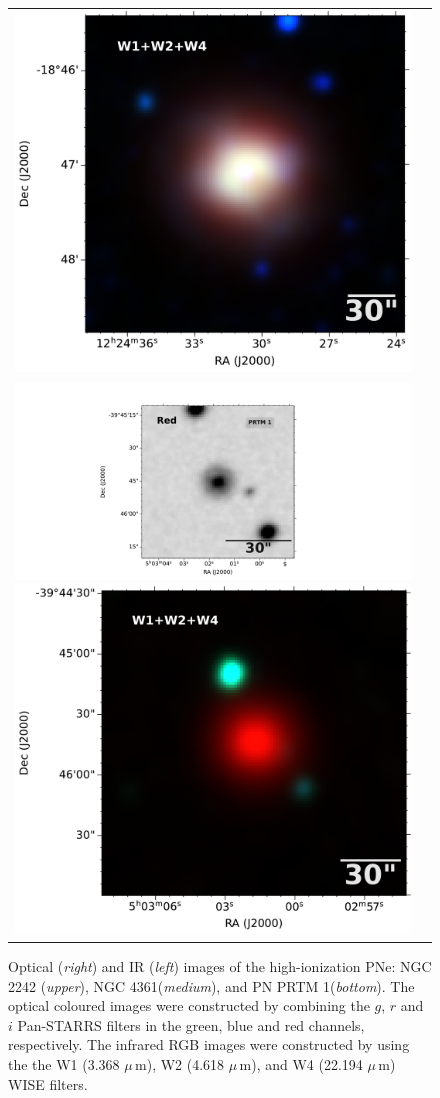 \documentclass[fleqn,usenatbib]{mnras}
\begin{document}
\begin{figure}
\begin{tabular}{l l}
\includegraphics[width=0.5\linewidth]{Figs/1855m182_ac51-w4-int-3_ra186.12812938647002_dec-18.78487981564_asec200.000-421-RGB}\\
\includegraphics[width=0.535\linewidth, trim=280 10 330 10, clip]{Figs/dss_search_red.pdf}
\includegraphics[width=0.47\linewidth, trim=58 0 0 0]{Figs/0754m394_ac51-w4-int-3_ra75.75721626934_dec-39.76236833917_asec150.000-421-RGB.pdf}\\

\end{tabular}  
  \caption{Optical (\textit{right}) and IR (\textit{left}) images of the 
    high-ionization PNe: NGC 2242 (\textit{upper}),  NGC 4361(\textit{medium}), and
    PN PRTM 1(\textit{bottom}).
    The optical coloured images were constructed by combining the
    $g$, $r$ and $i$ Pan-STARRS filters in the green, blue and red channels, respectively.
    The infrared RGB images were constructed by using the the W1 (3.368 $\mu$\,m), W2
    (4.618 $\mu$\,m), and W4 (22.194 $\mu$\,m) WISE filters.} 
  \label{fig:images-known}
\end{figure}
\end{document}
